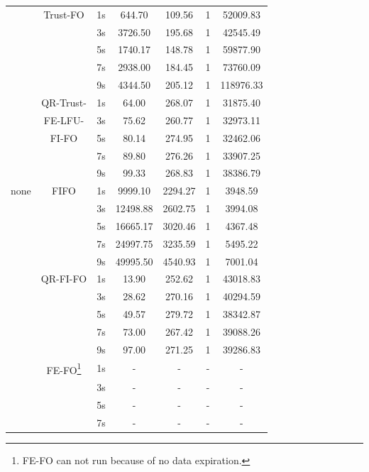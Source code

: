 \begin{center}
\begin{longtable}{|c||c||c|c|c|c|c|}
			  & Trust-FO & 1s & 644.70 & 109.56 & 1 & 52009.83 \\ \cline{3-7}
			  &			    & 3s & 3726.50 & 195.68 & 1& 42545.49\\ \cline{3-7}
			  &             & 5s & 1740.17 & 148.78 & 1& 59877.90\\ \cline{3-7}
			  &             & 7s & 2938.00 & 184.45 & 1& 73760.09\\ \cline{3-7}
			  &          & 9s & 4344.50 & 205.12 & 1& 118976.33\\ \cline{2-7}
              & QR-Trust- & 1s & 64.00 & 268.07 & 1& 31875.40 \\ \cline{3-7}
			  &	FE-LFU-   & 3s & 75.62 & 260.77 & 1& 32973.11 \\ \cline{3-7}
			  & FI-FO     & 5s & 80.14 & 274.95 & 1& 32462.06 \\ \cline{3-7}
			  &           & 7s & 89.80 & 276.26 & 1& 33907.25 \\ \cline{3-7}
			  &           & 9s & 99.33 & 268.83 & 1& 38386.79 \\ \hhline{|=#=#=|=|=|=|=|}
        none   & FIFO & 1s & 9999.10 & 2294.27 & 1 & 3948.59 \\ \cline{3-7}
			   &	  & 3s & 12498.88 & 2602.75 & 1 & 3994.08 \\ \cline{3-7}
			   &      & 5s & 16665.17 & 3020.46 & 1 & 4367.48 \\ \cline{3-7}
			   &      & 7s & 24997.75 & 3235.59 & 1 & 5495.22 \\ \cline{3-7}
			   &      & 9s & 49995.50 & 4540.93 & 1 & 7001.04 \\ \cline{2-7}
			   & QR-FI-FO & 1s & 13.90 & 252.62 & 1 & 43018.83 \\ \cline{3-7}
			   &		  & 3s & 28.62 & 270.16 & 1 & 40294.59 \\ \cline{3-7}
			   &          & 5s & 49.57 & 279.72 & 1 & 38342.87 \\ \cline{3-7}
			   &          & 7s & 73.00 & 267.42 & 1 & 39088.26 \\ \cline{3-7}
			   &          & 9s & 97.00 & 271.25 & 1 & 39286.83 \\ \cline{2-7}
 			   & FE-FO\footnote{FE-FO can not run because of no data expiration.} & 1s & - & - & - & - \\ \cline{3-7}
			   &	   & 3s & - & - & - & - \\ \cline{3-7}
			   &       & 5s & - & - & - & - \\ \cline{3-7}
			   &       & 7s & - & - & - & - \\ \cline{3-7}

\end{longtable}
\end{center}
